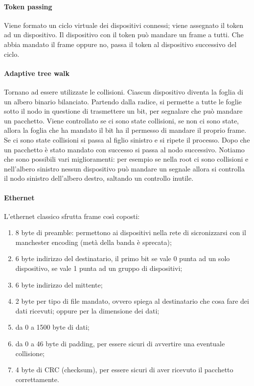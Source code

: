 \documentclass{article}
\begin{document}
\paragraph{Token passing}
Viene formato un ciclo virtuale dei dispositivi connessi; viene assegnato il
token ad un dispositivo. Il dispositivo con il token può mandare un frame a
tutti. Che abbia mandato il frame oppure no, passa il token al dispositivo
successivo del ciclo.

\paragraph{Adaptive tree walk}
Tornano ad essere utilizzate le collisioni. Ciascun dispositivo diventa la
foglia di un albero binario bilanciato. Partendo dalla radice, si permette a
tutte le foglie sotto il nodo in questione di trasmettere un bit, per segnalare
che può mandare un pacchetto. Viene controllato se ci sono state collisioni,
se non ci sono state, allora la foglia che ha mandato il bit ha il permesso di
mandare il proprio frame. Se ci sono state collisioni si passa al figlio
sinistro e si ripete il processo. Dopo che un pacchetto è stato mandato con
successo si passa al nodo successivo. Notiamo che sono possibili vari
miglioramenti: per esempio se nella root ci sono collisioni e nell'albero
sinistro nessun dispositivo può mandare un segnale allora si controlla il nodo
sinistro dell'albero destro, saltando un controllo inutile.

\paragraph{Ethernet}
L'ethernet classico sfrutta frame così coposti:
\begin{enumerate}
	\item 8 byte di preamble: permettono ai dispositivi nella rete di
	      sicronizzarsi con il manchester encoding (metà della banda è sprecata);

	\item 6 byte indirizzo del destinatario, il primo bit se vale 0 punta ad un
	      solo dispositivo, se vale 1 punta ad un gruppo di dispositivi;

	\item 6 byte indirizzo del mittente;

	\item 2 byte per tipo di file mandato, ovvero spiega al destinatario che
	      cosa fare dei dati ricevuti; oppure per la dimensione dei dati;

	\item da 0 a 1500 byte di dati;

	\item da 0 a 46 byte di padding, per essere sicuri di avvertire una
	      eventuale collisione;

	\item 4 byte di CRC (checksum), per essere sicuri di aver ricevuto il pacchetto
	      correttamente.
\end{enumerate}
\end{document}
